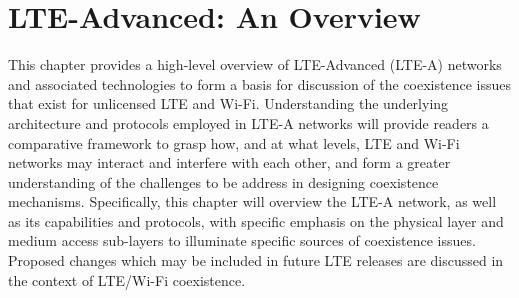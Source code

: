 %
%
%

\chapter{LTE-Advanced: An Overview}
\label{overview-lte} %


This chapter provides a high-level overview of LTE-Advanced (LTE-A) networks and associated technologies to form a basis for discussion of the coexistence issues that exist for unlicensed LTE and \mbox{Wi-Fi}. Understanding the underlying architecture and protocols employed in LTE-A networks will provide readers a comparative framework to grasp how, and at what levels, LTE and \mbox{Wi-Fi} networks may interact and interfere with each other, and form a greater understanding of the challenges to be address in designing coexistence mechanisms. Specifically, this chapter will overview the LTE-A network, as well as its capabilities and protocols, with specific emphasis on the physical layer and medium access sub-layers to illuminate specific sources of coexistence issues. Proposed changes which may be included in future LTE releases are discussed in the context of LTE/\mbox{Wi-Fi} coexistence.


